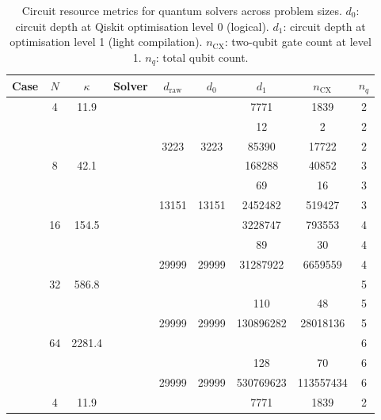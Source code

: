 \begin{table}[htbp]
  \centering
  \caption{Circuit resource metrics for quantum solvers across problem sizes. $d_0$: circuit depth at Qiskit optimisation level 0 (logical). $d_1$: circuit depth at optimisation level 1 (light compilation). $n_\mathrm{CX}$: two-qubit gate count at level 1. $n_q$: total qubit count.}
  \label{tab:circuit_resources}
  \begin{tabular}{l S[table-format=3.0] S[table-format=4.1] l S[table-format=6.0] S[table-format=6.0] S[table-format=6.0] S[table-format=5.0] S[table-format=2.0]}
    \toprule
    {Case} & {$N$} & {$\kappa$} & {Solver} & {$d_\mathrm{raw}$} & {$d_0$} & {$d_1$} & {$n_\mathrm{CX}$} & {$n_q$} \\
    \midrule
     & 4 & 11.9 &  & {\text{---}} & {\text{---}} & 7771 & 1839 & 2 \\
     &  &  &  & {\text{---}} & {\text{---}} & 12 & 2 & 2 \\
     &  &  &  & 3223 & 3223 & 85390 & 17722 & 2 \\
     & 8 & 42.1 &  & {\text{---}} & {\text{---}} & 168288 & 40852 & 3 \\
     &  &  &  & {\text{---}} & {\text{---}} & 69 & 16 & 3 \\
     &  &  &  & 13151 & 13151 & 2452482 & 519427 & 3 \\
     & 16 & 154.5 &  & {\text{---}} & {\text{---}} & 3228747 & 793553 & 4 \\
     &  &  &  & {\text{---}} & {\text{---}} & 89 & 30 & 4 \\
     &  &  &  & 29999 & 29999 & 31287922 & 6659559 & 4 \\
     & 32 & 586.8 &  & {\text{---}} & {\text{---}} & {\text{---}} & {\text{---}} & 5 \\
     &  &  &  & {\text{---}} & {\text{---}} & 110 & 48 & 5 \\
     &  &  &  & 29999 & 29999 & 130896282 & 28018136 & 5 \\
     & 64 & 2281.4 &  & {\text{---}} & {\text{---}} & {\text{---}} & {\text{---}} & 6 \\
     &  &  &  & {\text{---}} & {\text{---}} & 128 & 70 & 6 \\
     &  &  &  & 29999 & 29999 & 530769623 & 113557434 & 6 \\
    \midrule
     & 4 & 11.9 &  & {\text{---}} & {\text{---}} & 7771 & 1839 & 2 \\

\end{tabular}
\end{table}
